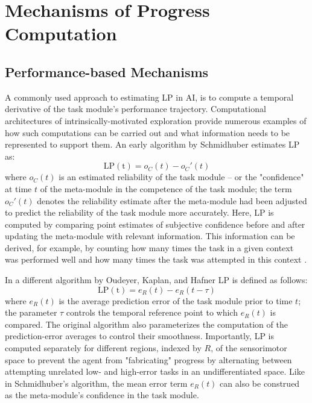 \section{Mechanisms of Progress Computation}

\subsection{Performance-based Mechanisms}\label{subsec:performance-based_mechanisms}

A commonly used approach to estimating \ac{LP} in \ac{AI}, is to compute a temporal derivative of the task module's performance trajectory. Computational architectures of intrinsically-motivated exploration provide numerous examples of how such computations can be carried out and what information needs to be represented to support them. An early algorithm by Schmidhuber \parencite{schmidhuber_curious_1991} estimates \ac{LP} as:
\begin{equation}
    \mathrm{LP(t)} = o_C(t) - o_C'(t)
\end{equation}
where $o_C(t)$ is an estimated reliability of the task module -- or the "confidence" at time $t$ of the meta-module in the competence of the task module; the term $o_C'(t)$ denotes the reliability estimate after the meta-module had been adjusted to predict the reliability of the task module more accurately. Here, \ac{LP} is computed by comparing point estimates of subjective confidence before and after updating the meta-module with relevant information. This information can be derived, for example, by counting how many times the task in a given context was performed well and how many times the task was attempted in this context \parencite{schmidhuber_curious_1991}.

In a different algorithm by Oudeyer, Kaplan, and Hafner \parencite{oudeyer_intrinsic_2007} \ac{LP} is defined as follows:
\begin{equation}
    \mathrm{LP(t)} = e_R(t) - e_R(t-\tau)
\end{equation}
where $e_R(t)$ is the average prediction error of the task module prior to time $t$; the parameter $\tau$ controls the temporal reference point to which $e_R(t)$ is compared. The original algorithm also parameterizes the computation of the prediction-error averages to control their smoothness. Importantly, \ac{LP} is computed separately for different regions, indexed by $R$, of the sensorimotor space to prevent the agent from "fabricating" progress by alternating between attempting unrelated low- and high-error tasks in an undifferentiated space. Like in Schmidhuber's algorithm, the mean error term $e_R(t)$ can also be construed as the meta-module's confidence in the task module. 

